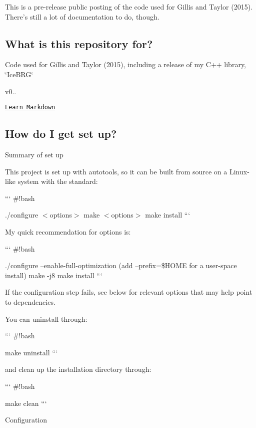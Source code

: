 This is a pre-\/release public posting of the code used for Gillis and Taylor (2015). There's still a lot of documentation to do, though.

\subsection*{What is this repository for?}


\begin{DoxyItemize}
\item Code used for Gillis and Taylor (2015), including a release of my C++ library, \char`\"{}\-Ice\-B\-R\-G\char`\"{}
\item v0..
\item \href{https://bitbucket.org/tutorials/markdowndemo}{\tt Learn Markdown}
\end{DoxyItemize}

\subsection*{How do I get set up?}


\begin{DoxyItemize}
\item Summary of set up
\end{DoxyItemize}

This project is set up with autotools, so it can be built from source on a Linux-\/like system with the standard\-:

``` \#!bash

./configure $<$options$>$ make $<$options$>$ make install ```

My quick recommendation for options is\-:

``` \#!bash

./configure --enable-\/full-\/optimization (add --prefix=\$\-H\-O\-M\-E for a user-\/space install) make -\/j8 make install ```

If the configuration step fails, see below for relevant options that may help point to dependencies.

You can uninstall through\-:

``` \#!bash

make uninstall ```

and clean up the installation directory through\-:

``` \#!bash

make clean ```


\begin{DoxyItemize}
\item Configuration
\end{DoxyItemize}

